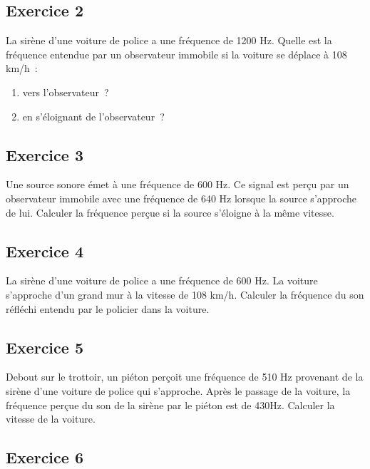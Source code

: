 \subsection{Exercice 2} %

La sirène d'une voiture de police a une fréquence de 1200 Hz. Quelle est
la fréquence entendue par un observateur immobile si la voiture se
déplace à 108 km/h~:
\begin{enumerate}
	\item vers l'observateur~?
	\item en s'éloignant de l'observateur~?
\end{enumerate}

\subsection{Exercice 3} %

Une source sonore émet à une fréquence de 600 Hz. Ce signal est perçu par
un observateur immobile avec une fréquence de 640 Hz lorsque la source
s'approche de lui. Calculer la fréquence perçue si la source s'éloigne à
la même vitesse.

\subsection{Exercice 4} %

La sirène d'une voiture de police a une fréquence de 600 Hz. La voiture
s'approche d'un grand mur à la vitesse de 108 km/h. Calculer la
fréquence du son réfléchi entendu par le policier dans la voiture.

\subsection{Exercice 5} %

Debout sur le trottoir, un piéton perçoit une fréquence de 510 Hz
provenant de la sirène d'une voiture de police qui s'approche. Après le
passage de la voiture, la fréquence perçue du son de la sirène par le
piéton est de 430Hz. Calculer la vitesse de la voiture.

\subsection{Exercice 6 }

